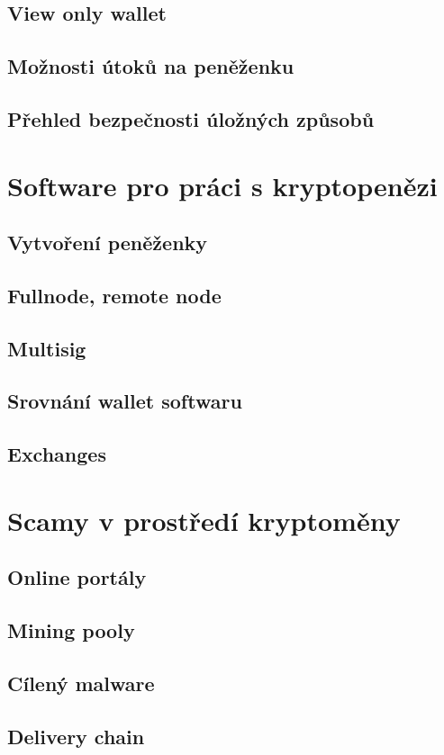 \documentclass[
  printed, %
  table,   %
  nolof,     %
  nolot,     %
           oneside, color
]{fithesis3}
\begin{document}
\subsection{View only wallet}
\subsection{Možnosti útoků na peněženku}
\subsection{Přehled bezpečnosti úložných způsobů}
\section{Software pro práci s kryptopenězi}
\subsection{Vytvoření peněženky}
\subsection{Fullnode, remote node}
\subsection{Multisig}
\subsection{Srovnání wallet softwaru}
\subsection{Exchanges}
\section{Scamy v prostředí kryptoměny}
\subsection{Online portály}
\subsection{Mining pooly}
\subsection{Cílený malware}
\subsection{Delivery chain}
\end{document}

